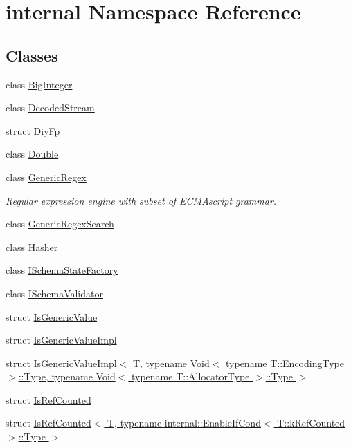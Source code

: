\hypertarget{namespaceinternal}{}\section{internal Namespace Reference}
\label{namespaceinternal}
\subsection*{Classes}
\begin{DoxyCompactItemize}
\item 
class \hyperlink{classinternal_1_1BigInteger}{Big\+Integer}
\item 
class \hyperlink{classinternal_1_1DecodedStream}{Decoded\+Stream}
\item 
struct \hyperlink{structinternal_1_1DiyFp}{Diy\+Fp}
\item 
class \hyperlink{classinternal_1_1Double}{Double}
\item 
class \hyperlink{classinternal_1_1GenericRegex}{Generic\+Regex}
\begin{DoxyCompactList}\small\item\em Regular expression engine with subset of E\+C\+M\+Ascript grammar. \end{DoxyCompactList}\item 
class \hyperlink{classinternal_1_1GenericRegexSearch}{Generic\+Regex\+Search}
\item 
class \hyperlink{classinternal_1_1Hasher}{Hasher}
\item 
class \hyperlink{classinternal_1_1ISchemaStateFactory}{I\+Schema\+State\+Factory}
\item 
class \hyperlink{classinternal_1_1ISchemaValidator}{I\+Schema\+Validator}
\item 
struct \hyperlink{structinternal_1_1IsGenericValue}{Is\+Generic\+Value}
\item 
struct \hyperlink{structinternal_1_1IsGenericValueImpl}{Is\+Generic\+Value\+Impl}
\item 
struct \hyperlink{structinternal_1_1IsGenericValueImpl_3_01T_00_01typename_01Void_3_01typename_01T_1_1EncodingType794abcc01fcce01e300668fa57e4d036}{Is\+Generic\+Value\+Impl$<$ T, typename Void$<$ typename T\+::\+Encoding\+Type $>$\+::\+Type, typename Void$<$ typename T\+::\+Allocator\+Type $>$\+::\+Type $>$}
\item 
struct \hyperlink{structinternal_1_1IsRefCounted}{Is\+Ref\+Counted}
\item 
struct \hyperlink{structinternal_1_1IsRefCounted_3_01T_00_01typename_01internal_1_1EnableIfCond_3_01T_1_1kRefCounted_01_4_1_1Type_01_4}{Is\+Ref\+Counted$<$ T, typename internal\+::\+Enable\+If\+Cond$<$ T\+::k\+Ref\+Counted $>$\+::\+Type $>$}

\end{DoxyCompactItemize}
